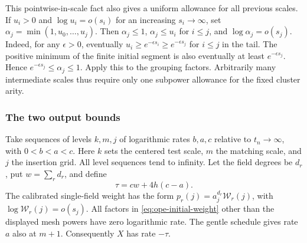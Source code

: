 This pointwise-in-scale fact also gives a uniform allowance for all
previous scales. If $u_i>0$ and $\log u_i=o(s_i)$ for an increasing
$s_i\to\infty$, set $\alpha_j=\min(1,u_0,\ldots,u_j)$. Then
$\alpha_j\leq1$, $\alpha_j\leq u_i$ for $i\leq j$, and
$\log\alpha_j=o(s_j)$. Indeed, for any $\epsilon>0$, eventually
$u_i\geq e^{-\epsilon s_i}\geq e^{-\epsilon s_j}$ for $i\leq j$
in the tail. The positive minimum of the finite initial segment is
also eventually at least $e^{-\epsilon s_j}$. Hence
$e^{-\epsilon s_j}\leq\alpha_j\leq1$. Apply this to the grouping
factors. Arbitrarily many intermediate scales thus require only one
subpower allowance for the fixed cluster arity.

\subsubsection{The two output bounds}
Take sequences of levels $k,m,j$ of logarithmic rates $b,a,c$ relative
to $t_n\to\infty$, with $0<b<a<c$. Here $k$ sets the centered test
scale, $m$ the matching scale, and $j$ the insertion grid. All level
sequences tend to infinity. Let the field degrees be $d_r$, put
$w=\sum_r d_r$, and define
\[
 \tau=cw+4h(c-a).
\]
The calibrated single-field weight has the form
$p_r(j)=a_j^{d_r}\mathcal W_r(j)$, with
$\log\mathcal W_r(j)=o(s_j)$. All factors in
\eqref{eq:ope-initial-weight} other than the displayed mesh powers
have zero logarithmic rate. The gentle schedule gives rate $a$ also
at $m+1$. Consequently $X$ has rate $-\tau$.

